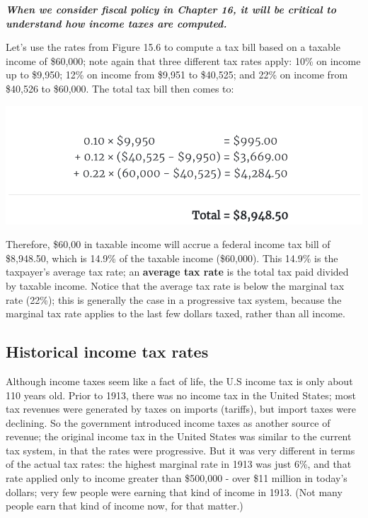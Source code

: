 \documentclass[11pt]{article} %
\begin{document}
\textbf{\textit{When we consider fiscal policy in Chapter 16, it will be critical to understand how income taxes are computed.}}

Let's use the rates from Figure 15.6 to compute a tax bill based on a taxable income of \$60,000; note again that three different tax rates apply: 10\% on income up to \$9,950; 12\% on income from \$9,951 to \$40,525; and 22\% on income from \$40,526 to \$60,000. The total tax bill then comes to:
\begin{center}
\includegraphics[scale=0.75]{images/Tax bill Example.png} 
\end{center}
Therefore, \$60,00 in taxable income will accrue a federal income tax bill of \$8,948.50, which is 14.9\% of the taxable income (\$60,000). This 14.9\% is the taxpayer's average tax rate; an \textbf{average tax rate} is the total tax paid divided by taxable income. Notice that the average tax rate is below the marginal tax rate (22\%); this is generally the case in a progressive tax system, because the marginal tax rate applies to the last few dollars taxed, rather than all income.

\subsection*{Historical income tax rates}
Although income taxes seem like a fact of life, the U.S income tax is only about 110 years old. Prior to 1913, there was no income tax in the United States; most tax revenues were generated by taxes on imports (tariffs), but import taxes were declining. So the government introduced income taxes as another source of revenue; the original income tax in the United States was similar to the current tax system, in that the rates were progressive. But it was very different in terms of the actual tax rates: the highest marginal rate in 1913 was just 6\%, and that rate applied only to income greater than \$500,000 - over \$11 million in today's dollars; very few people were earning that kind of income in 1913. (Not many people earn that kind of income now, for that matter.)
\end{document}
